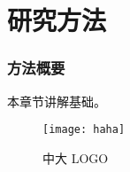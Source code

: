 
\chapter{研究方法}

\subsection{方法概要}

本章节讲解基础。

\begin{figure}[htbp]
    \centering
    \texttt{[image: haha]}
    \caption{中大 LOGO}
\end{figure}
